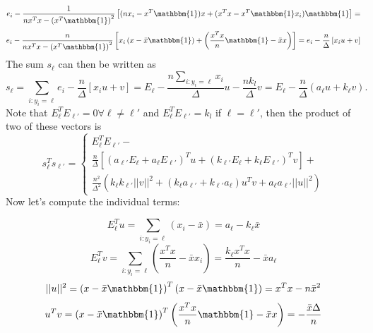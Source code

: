 \begin{equation}
        e_{i} - \frac{1}{n x^{T}x - \left(x^{T}\mathbbm{1}\right)^{2}}
        \left[(n x_{i} - x^{T}\mathbbm{1})x + (x^{T}x - x^{T}\mathbbm{1}x_{i})\mathbbm{1}\right] =
\end{equation}
\begin{equation}
        e_{i} - \frac{n}{n x^{T}x - \left(x^{T}\mathbbm{1}\right)^{2}}
        \left[x_{i}\left(x - \bar{x}\mathbbm{1}\right) + \left(\frac{x^{T}x}{n}\mathbbm{1} - \bar{x}x\right)\right]=
        e_{i} - \frac{n}{\Delta}\left[x_{i}u + v\right]
\end{equation}
The sum $s_{\ell}$ can then be written as
\begin{equation}
        s_{\ell} = \sum_{i:y_{i}=\ell} e_{i} - \frac{n}{\Delta}\left[x_{i}u+v\right] = E_{\ell} - \frac{n\sum_{i:y_{i}=\ell}x_{i}}{\Delta}u - \frac{nk_{l}}{\Delta}v = E_{\ell} - \frac{n}{\Delta}\left(a_{\ell}u + k_{\ell}v \right).
\end{equation}
Note that $E_{\ell}^{T}E_{\ell'} = 0 \forall \ell \neq \ell'$ and  $E_{\ell}^{T}E_{\ell'} = k_{l}$ if $\ell=\ell'$, then the product of two of these vectors is
\begin{equation}
    s_{\ell}^{T}s_{\ell'} =
    \left\lbrace\begin{array}{l}
        E_{\ell}^{T}E_{\ell'} -\\
        \frac{n}{\Delta}\left[(a_{\ell'}E_{\ell} + a_{\ell}E_{\ell'})^{T}u + (k_{\ell'}E_{\ell}+k_{\ell}E_{\ell'})^{T}v\right]+\\
        \frac{n^{2}}{\Delta^{2}}\left(
            k_{\ell}k_{\ell'}||v||^{2}
            + \left(k_{\ell}a_{\ell'} + k_{\ell'}a_{\ell}\right)u^{T}v
            +a_{\ell}a_{\ell'}||u||^{2}\right)
    \end{array}\right.
\end{equation}
Now let's compute the individual terms:

\begin{equation}
    E_{\ell}^{T}u = \sum_{i:y_{i}=\ell}\left(x_{i} - \bar{x}\right) = a_{\ell} - k_{\ell}\bar{x}
\end{equation}
\begin{equation}
    E_{\ell}^{T}v = \sum_{i:y_{i}=\ell}\left(\frac{x^{T}x}{n} - \bar{x}x_{i}\right) = \frac{k_{\ell}x^{T}x}{n} - \bar{x}a_{\ell}
\end{equation}
\begin{equation}
    ||u||^{2} = \left(x - \bar{x}\mathbbm{1}\right)^{T}\left(x - \bar{x}\mathbbm{1}\right) = x^{T}x - n\bar{x}^{2}
\end{equation}
\begin{equation}
    u^{T}v = \left(x - \bar{x}\mathbbm{1}\right)^{T}\left(\frac{x^{T}x}{n}\mathbbm{1} - \bar{x}x\right) = -\frac{\bar{x}\Delta}{n}
\end{equation}

